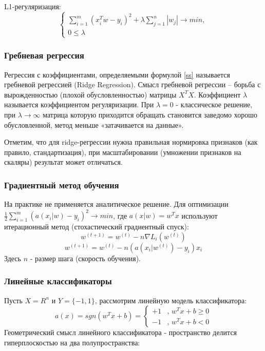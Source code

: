 L1-регуляризация:
\begin{equation*}
 \begin{cases}
   \sum\limits_{i=1}^m (x_i^Tw - y_i)^2 + \lambda \sum\limits_{j=1}^n |w_j| \rightarrow min, 
   \\
   0 \leq \lambda
\end{cases}
\end{equation*}

\subsubsection{Гребневая регрессия}
Регрессия с коэффициентами, определяемыми формулой \ref{ss} называется гребневой регрессией (Ridge Regression). Смысл гребневой регрессии – борьба с вырожденностью (плохой обусловленностью) матрицы $X^TX$. Коэффициент $\lambda$ называется коэффициентом регуляризации. При $\lambda = 0$ - классическое решение, при
$\lambda \rightarrow \infty$ матрица которую приходится обращать становится заведомо хорошо обусловленной, метод меньше «затачивается на данные».

Отметим, что для ridge-регрессии нужна правильная нормировка признаков
(как правило, стандартизация), при масштабировании (умножении признаков на
скаляры) результат может отличаться.

\subsubsection{Градиентный метод обучения}
На практике не применяется аналитическое решение. Для оптимизации $\frac{1}{2} \sum\limits_{i=1}^m (a(x_i|w) - y_i)^2 \rightarrow min$, где $a(x|w) = w^Tx$ используют итерационный метод (стохастический градиентный спуск):
\begin{equation}
w^{(t+1)} = w^{(t)} - n\nabla L_i(w^{(t)})
\end{equation}
\begin{equation}
w^{(t+1)} = w^{(t)} - n(a(x_i|w^{(t)}) - y_i)x_i 
\end{equation}
Здесь $n$ - размер шага (скорость обучения).

\subsubsection{Линейные классификаторы}
Пусть $X= R^n$ и $Y = \{-1, 1\}$, рассмотрим линейную модель классификатора:
\begin{equation*}
a(x) = sgn(w^Tx + b) =  
 \begin{cases}
   +1 &\text{, $w^Tx + b \geq 0$}\\
   -1 &\text{, $w^Tx + b < 0$}
 \end{cases}
\end{equation*}
Геометрический смысл линейного классификатора - пространство делится гиперплоскостью на два полупространства:

